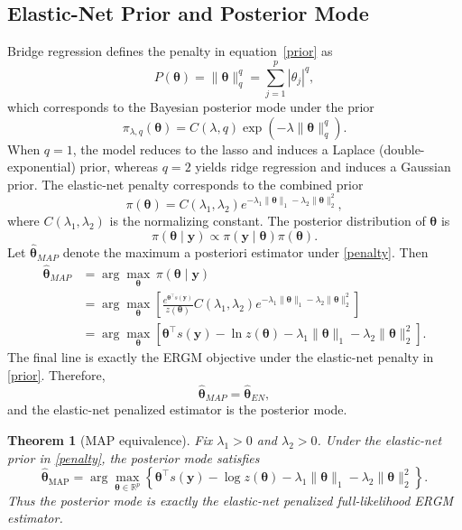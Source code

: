 \documentclass[preprint,12pt,authoryear]{elsarticle}
\newtheorem{theorem}{Theorem}
\def\bs{\boldsymbol}
\def\th{\boldsymbol{\theta}}
\begin{document}
\subsection{Elastic-Net Prior and Posterior Mode}
Bridge regression \citep{Frank1993,Fu1998} defines the penalty in equation~\eqref{prior} as
\[
P(\th)=\|\th\|_{q}^{q}=\sum_{j=1}^{p}|\theta_j|^{q},
\]
which corresponds to the Bayesian posterior mode under the prior
\begin{equation}
    \pi_{\lambda,q}(\th)=C(\lambda,q)\exp\!\left(-\lambda\|\th\|_q^q\right).
\end{equation}
When \(q=1\), the model reduces to the lasso and induces a Laplace (double-exponential) prior, whereas \(q=2\) yields ridge regression and induces a Gaussian prior. The elastic-net penalty corresponds to the combined prior
\begin{equation}\label{penalty}
    \pi(\th)=C(\lambda_1,\lambda_2)e^{-\lambda_1\|\th\|_1-\lambda_2\|\th\|_2^2},
\end{equation}
where \(C(\lambda_1,\lambda_2)\) is the normalizing constant. The posterior distribution of \(\th\) is
\begin{equation}
    \pi(\th\mid \bs y)\propto \pi(\bs y\mid \th)\pi(\th).
\end{equation}
Let \(\hat{\th}_{MAP}\) denote the maximum a posteriori estimator under \eqref{penalty}. Then
\begin{align}\label{MAP}
   \hat{\th}_{MAP}
   &= \arg\max_{\th}\,\pi(\th\mid \bs y) \\
   &= \arg\max_{\th}\left[
   \frac{e^{\th^\top s(\bs y)}}{z(\th)}
   C(\lambda_1,\lambda_2)
   e^{-\lambda_1\|\th\|_1-\lambda_2\|\th\|_2^2}
   \right] \\
   &= \arg\max_{\th}\left[
   \th^\top s(\bs y)-\ln z(\th)-\lambda_1\|\th\|_1-\lambda_2\|\th\|_2^2
   \right].
\end{align}
The final line is exactly the ERGM objective under the elastic-net penalty in \eqref{prior}. Therefore,
\[
\hat{\th}_{MAP}=\hat{\th}_{EN},
\]
and the elastic-net penalized estimator is the posterior mode.


\begin{theorem}[MAP equivalence]
\label{thm:map-equivalence}
Fix \(\lambda_1>0\) and \(\lambda_2>0\). Under the elastic-net prior in
\eqref{penalty}, the posterior mode satisfies
\[
\widehat{\th}_{\mathrm{MAP}}
=
\arg\max_{\th\in\mathbb R^p}
\left\{
\th^\top s(\bs y)-\log z(\th)
-\lambda_1\|\th\|_1-\lambda_2\|\th\|_2^2
\right\}.
\]
Thus the posterior mode is exactly the elastic-net penalized full-likelihood
ERGM estimator.
\end{theorem}
\end{document}
